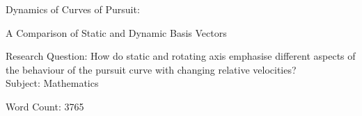 \documentclass[pstricks, border=12pt]{article}
\begin{document}
\begin{titlepage}
    \begin{center}
        \vspace*{1cm}
            
        \Huge
        Dynamics of Curves of Pursuit:
            
        \vspace{0.5cm}
        \LARGE
        A Comparison of Static and Dynamic Basis Vectors\\
            
        \vspace{0.75cm}

        
        \large 
        Research Question: How do static and rotating axis emphasise different aspects of the behaviour of the pursuit curve
with changing relative velocities?\\
\vspace{0.25cm}
        Subject: Mathematics\\
        \vspace{0.5cm}
            
        Word Count: 3765
           \vfill            
    \end{center}
\end{titlepage}
\newpage
\tableofcontents
\newpage

\end{document}
